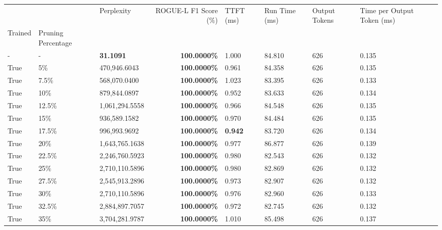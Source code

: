 \begin{table}[H]
\label{tab:evaluation-pipeline-5-trained}
\begin{tabular}{lllrllll}
\toprule
 &  & Perplexity & ROGUE-L F1 Score (\%) & TTFT (ms) & Run Time (ms) & Output Tokens & Time per Output Token (ms) \\
Trained & Pruning Percentage &  &  &  &  &  &  \\
\midrule
- & - & \bfseries 31.1091 & \bfseries 100.0000\% & 1.000 & 84.810 & 626 & 0.135 \\
\cline{1-8} \cline{2-8}
True & 5\% & 470,946.6043 & \bfseries \color{red} 100.0000\% & 0.961 & 84.358 & 626 & 0.135 \\
\cline{1-8} \cline{2-8}
True & 7.5\% & 568,070.0400 & \bfseries \color{red} 100.0000\% & 1.023 & 83.395 & 626 & 0.133 \\
\cline{1-8} \cline{2-8}
True & 10\% & 879,844.0897 & \bfseries \color{red} 100.0000\% & 0.952 & 83.633 & 626 & 0.134 \\
\cline{1-8} \cline{2-8}
True & 12.5\% & 1,061,294.5558 & \bfseries \color{red} 100.0000\% & 0.966 & 84.548 & 626 & 0.135 \\
\cline{1-8} \cline{2-8}
True & 15\% & 936,589.1582 & \bfseries \color{red} 100.0000\% & 0.970 & 84.484 & 626 & 0.135 \\
\cline{1-8} \cline{2-8}
True & 17.5\% & 996,993.9692 & \bfseries \color{red} 100.0000\% & \bfseries \color{red} 0.942 & 83.720 & 626 & 0.134 \\
\cline{1-8} \cline{2-8}
True & 20\% & 1,643,765.1638 & \bfseries \color{red} 100.0000\% & 0.977 & 86.877 & 626 & 0.139 \\
\cline{1-8} \cline{2-8}
True & 22.5\% & 2,246,760.5923 & \bfseries \color{red} 100.0000\% & 0.980 & 82.543 & 626 & 0.132 \\
\cline{1-8} \cline{2-8}
True & 25\% & 2,710,110.5896 & \bfseries \color{red} 100.0000\% & 0.980 & 82.869 & 626 & 0.132 \\
\cline{1-8} \cline{2-8}
True & 27.5\% & 2,545,913.2896 & \bfseries \color{red} 100.0000\% & 0.973 & 82.907 & 626 & 0.132 \\
\cline{1-8} \cline{2-8}
True & 30\% & 2,710,110.5896 & \bfseries \color{red} 100.0000\% & 0.976 & 82.960 & 626 & 0.133 \\
\cline{1-8} \cline{2-8}
True & 32.5\% & 2,884,897.7057 & \bfseries \color{red} 100.0000\% & 0.972 & 82.745 & 626 & 0.132 \\
\cline{1-8} \cline{2-8}
True & 35\% & 3,704,281.9787 & \bfseries \color{red} 100.0000\% & 1.010 & 85.498 & 626 & 0.137 \\

\end{tabular}
\end{table}
